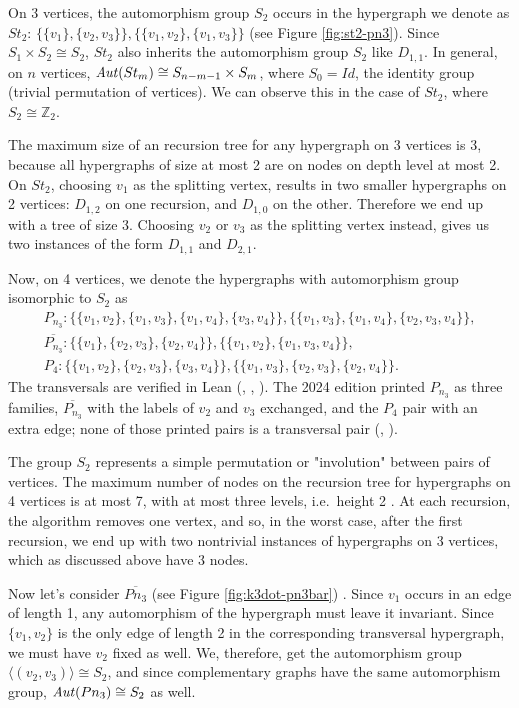 On 3 vertices, the automorphism group $S_2$ occurs in the hypergraph we denote as $St_2$: $\{\{v_1\},\{v_2,v_3\}\},\{\{v_1,v_2\},\{v_1,v_3\}\}$ (see Figure \ref{fig:st2-pn3}). Since $S_1\times S_2\cong S_2$, $St_2$ also inherits the automorphism group $S_2$ like $D_{1,1}$. In general, on $n$ vertices, $\mathit{Aut}(St_m)\cong S_{n-m-1}\times S_m$, where $S_0=Id$, the identity group (trivial permutation of vertices). We can observe this in the case of $St_2$, where $S_2\cong\mathbb{Z}_2$.

The maximum size of an \FKA{} recursion tree for any hypergraph on 3 vertices is 3, because all hypergraphs of size at most 2 are on nodes on depth level at most 2. On $St_2$, choosing $v_1$ as the splitting vertex, results in two smaller hypergraphs on 2 vertices: $D_{1,2}$ on one recursion, and $D_{1,0}$ on the other. Therefore we end up with a tree of size 3. Choosing $v_2$ or $v_3$ as the splitting vertex instead, gives us two instances of the form $D_{1,1}$ and $D_{2,1}$.

Now, on 4 vertices, we denote the hypergraphs with automorphism group isomorphic to $S_2$ as
\begin{gather*}
P_{n_3}:\{\{v_1,v_2\},\{v_1,v_3\},\{v_1,v_4\},\{v_3,v_4\}\},\{\{v_1,v_3\},\{v_1,v_4\},\{v_2,v_3,v_4\}\},\\[4pt]
\overline{P_{n_3}}:\{\{v_1\},\{v_2,v_3\},\{v_2,v_4\}\},\{\{v_1,v_2\},\{v_1,v_3,v_4\}\},\\[4pt]
P_4:\{\{v_1,v_2\},\{v_2,v_3\},\{v_3,v_4\}\},\{\{v_1,v_3\},\{v_2,v_3\},\{v_2,v_4\}\}.
\end{gather*}
The transversals are verified in Lean (, , ). The 2024 edition printed $P_{n_3}$ as three families, $\overline{P_{n_3}}$ with the labels of $v_2$ and $v_3$ exchanged, and the $P_4$ pair with an extra edge; none of those printed pairs is a transversal pair (, ).

The group $S_2$ represents a simple permutation or "involution" between pairs of vertices. The maximum number of nodes on the \FKA{} recursion tree for hypergraphs on 4 vertices is at most 7, with at most three levels, i.e.\ height 2 . At each recursion, the algorithm removes one vertex, and so, in the worst case, after the first recursion, we end up with two nontrivial instances of hypergraphs on 3 vertices, which as discussed above have 3 nodes.

Now let's consider $\overline{Pn_3}$ (see Figure \ref{fig:k3dot-pn3bar}) . Since $v_1$ occurs in an edge of length 1, any automorphism of the hypergraph must leave it invariant. Since $\{v_1,v_2\}$ is the only edge of length 2 in the corresponding transversal hypergraph, we must have $v_2$ fixed as well. We, therefore, get the automorphism group $\langle(v_2,v_3)\rangle\cong S_2$, and since complementary graphs have the same automorphism group, $\mathit{Aut}(Pn_3)\cong S_2$ as well.

